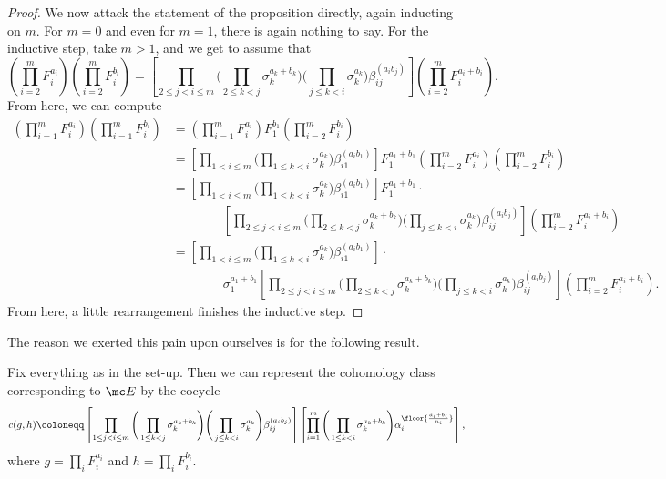 \documentclass{article}
\numberwithin{equation}{section}
\begin{document}
\begin{proof}
	We now attack the statement of the proposition directly, again inducting on $m$. For $m=0$ and even for $m=1$, there is again nothing to say. For the inductive step, take $m>1$, and we get to assume that
	\[\left(\prod_{i=2}^mF_i^{a_i}\right)\left(\prod_{i=2}^mF_i^{b_i}\right)=\left[\prod_{2\le j<i\le m}\Bigg(\prod_{2\le k<j}\sigma_k^{a_k+b_k}\Bigg)\Bigg(\prod_{j\le k<i}\sigma_k^{a_k}\Bigg)\beta_{ij}^{(a_ib_j)}\right]\left(\prod_{i=2}^mF_i^{a_i+b_i}\right).\]
	From here, we can compute
	\begin{align*}
		\left(\prod_{i=1}^mF_i^{a_i}\right)\left(\prod_{i=1}^mF_i^{b_i}\right) &= \left(\prod_{i=1}^mF_i^{a_i}\right)F_1^{b_1}\left(\prod_{i=2}^mF_i^{b_i}\right) \\
		&= \left[\prod_{1<i\le m}\Bigg(\prod_{1\le k<i}\sigma_k^{a_k}\Bigg)\beta_{i1}^{(a_ib_1)}\right]F_1^{a_1+b_1}\left(\prod_{i=2}^mF_i^{a_i}\right)\left(\prod_{i=2}^mF_i^{b_i}\right) \\
		&= \left[\prod_{1<i\le m}\Bigg(\prod_{1\le k<i}\sigma_k^{a_k}\Bigg)\beta_{i1}^{(a_ib_1)}\right]F_1^{a_1+b_1}\cdot \\
		&\qquad\qquad\left[\prod_{2\le j<i\le m}\Bigg(\prod_{2\le k<j}\sigma_k^{a_k+b_k}\Bigg)\Bigg(\prod_{j\le k<i}\sigma_k^{a_k}\Bigg)\beta_{ij}^{(a_ib_j)}\right]\left(\prod_{i=2}^mF_i^{a_i+b_i}\right) \\
		&= \left[\prod_{1<i\le m}\Bigg(\prod_{1\le k<i}\sigma_k^{a_k}\Bigg)\beta_{i1}^{(a_ib_1)}\right]\cdot \\
		&\qquad\qquad \sigma_1^{a_1+b_1}\left[\prod_{2\le j<i\le m}\Bigg(\prod_{2\le k<j}\sigma_k^{a_k+b_k}\Bigg)\Bigg(\prod_{j\le k<i}\sigma_k^{a_k}\Bigg)\beta_{ij}^{(a_ib_j)}\right]\left(\prod_{i=2}^mF_i^{a_i+b_i}\right).
	\end{align*}
	From here, a little rearrangement finishes the inductive step.
\end{proof}
The reason we exerted this pain upon ourselves is for the following result.
\begin{prop} \label{prop:writedowncocycle}
	Fix everything as in the set-up. Then we can represent the cohomology class corresponding to $\mc E$ by the cocycle
	\[c(g,h)\coloneqq\left[\prod_{1\le j<i\le m}\Bigg(\prod_{1\le k<j}\sigma_k^{a_k+b_k}\Bigg)\Bigg(\prod_{j\le k<i}\sigma_k^{a_k}\Bigg)\beta_{ij}^{(a_ib_j)}\right]\left[\prod_{i=1}^m\Bigg(\prod_{1\le k<i}\sigma_k^{a_k+b_k}\Bigg)\alpha_i^{\floor{\frac{a_i+b_i}{n_i}}}\right],\]
	where $g=\prod_iF_i^{a_i}$ and $h=\prod_iF_i^{b_i}$.
\end{prop}
\end{document}
